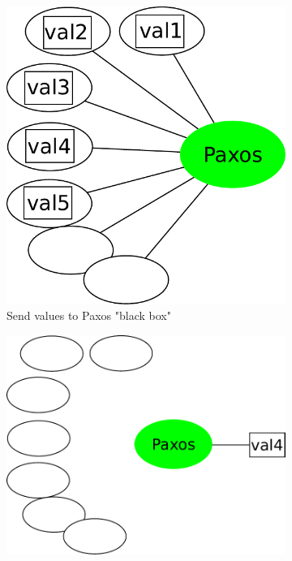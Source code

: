 \documentclass[english,11pt]{l4proj}
\begin{document}
\begin{figure}
    \begin{subfigure}[b]{0.22\textwidth}
        \includegraphics[width=\textwidth]{images/paxos1.pdf}
        \caption{Send values to Paxos "black box"}
    \end{subfigure}\hfill
    \begin{subfigure}[b]{0.32\textwidth}
        \includegraphics[width=\textwidth]{images/paxos2.pdf}

\end{subfigure}
\end{figure}
\end{document}
